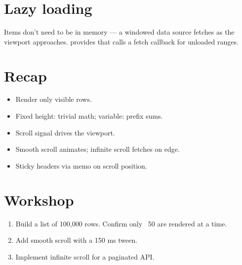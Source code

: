 \section{Lazy loading}

Items don't need to be in memory --- a windowed data
source fetches as the viewport approaches. \maya{} provides
 that calls a fetch callback for unloaded
ranges.

\section{Recap}

\begin{recap}
\begin{itemize}[leftmargin=*]
  \item Render only visible rows.
  \item Fixed height: trivial math; variable: prefix sums.
  \item Scroll signal drives the viewport.
  \item Smooth scroll animates; infinite scroll fetches on
    edge.
  \item Sticky headers via memo on scroll position.
\end{itemize}
\end{recap}

\section*{Workshop}

\begin{enumerate}[leftmargin=*]
  \item Build a list of 100,000 rows. Confirm only ~50 are
    rendered at a time.
  \item Add smooth scroll with a 150 ms tween.
  \item Implement infinite scroll for a paginated API.
\end{enumerate}
